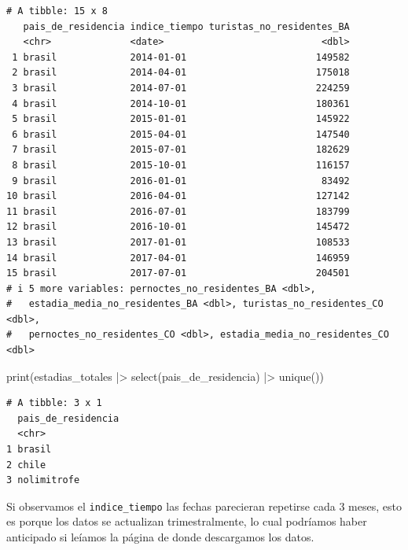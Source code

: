 \documentclass[
  spanish,
  letterpaper,
  DIV=11,
  numbers=noendperiod]{scrartcl}
\newenvironment{Shaded}{\begin{snugshade}}{\end{snugshade}}
\newcommand{\FunctionTok}[1]{\textcolor[rgb]{0.28,0.35,0.67}{#1}}
\newcommand{\NormalTok}[1]{\textcolor[rgb]{0.00,0.23,0.31}{#1}}
\newcommand{\SpecialCharTok}[1]{\textcolor[rgb]{0.37,0.37,0.37}{#1}}
\begin{document}
\begin{verbatim}
# A tibble: 15 x 8
   pais_de_residencia indice_tiempo turistas_no_residentes_BA
   <chr>              <date>                            <dbl>
 1 brasil             2014-01-01                       149582
 2 brasil             2014-04-01                       175018
 3 brasil             2014-07-01                       224259
 4 brasil             2014-10-01                       180361
 5 brasil             2015-01-01                       145922
 6 brasil             2015-04-01                       147540
 7 brasil             2015-07-01                       182629
 8 brasil             2015-10-01                       116157
 9 brasil             2016-01-01                        83492
10 brasil             2016-04-01                       127142
11 brasil             2016-07-01                       183799
12 brasil             2016-10-01                       145472
13 brasil             2017-01-01                       108533
14 brasil             2017-04-01                       146959
15 brasil             2017-07-01                       204501
# i 5 more variables: pernoctes_no_residentes_BA <dbl>,
#   estadia_media_no_residentes_BA <dbl>, turistas_no_residentes_CO <dbl>,
#   pernoctes_no_residentes_CO <dbl>, estadia_media_no_residentes_CO <dbl>
\end{verbatim}

\begin{Shaded}
\begin{Highlighting}[]
\FunctionTok{print}\NormalTok{(estadias\_totales }\SpecialCharTok{|\textgreater{}} \FunctionTok{select}\NormalTok{(pais\_de\_residencia) }\SpecialCharTok{|\textgreater{}} \FunctionTok{unique}\NormalTok{())}
\end{Highlighting}
\end{Shaded}

\begin{verbatim}
# A tibble: 3 x 1
  pais_de_residencia
  <chr>             
1 brasil            
2 chile             
3 nolimitrofe       
\end{verbatim}

Si observamos el \texttt{indice\_tiempo} las fechas parecieran repetirse
cada 3 meses, esto es porque los datos se actualizan trimestralmente, lo
cual podríamos haber anticipado si leíamos la página de donde
descargamos los datos.
\end{document}
